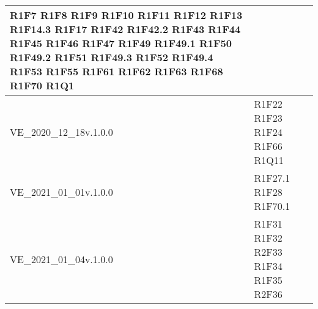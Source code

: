 \begin{center}
\begin{longtable}{|p{44mm}|p{22mm}|}
R1F7 \newline
R1F8 \newline
R1F9 \newline
R1F10 \newline
R1F11 \newline
R1F12 \newline
R1F13 \newline
R1F14.3 \newline
R1F17 \newline
R1F42 \newline
R1F42.2 \newline
R1F43 \newline
R1F44 \newline
R1F45 \newline
R1F46 \newline
R1F47 \newline
R1F49 \newline
R1F49.1 \newline
R1F50 \newline
R1F49.2 \newline
R1F51 \newline
R1F49.3 \newline
R1F52 \newline
R1F49.4 \newline
R1F53 \newline
R1F55 \newline
R1F61 \newline
R1F62 \newline
R1F63 \newline
R1F68 \newline
R1F70 \newline
R1Q1 
\\
\hline
VE\_2020\_12\_18v.1.0.0 &
R1F22 \newline
R1F23 \newline
R1F24 \newline
R1F66 \newline
R1Q11 
\\
\hline
VE\_2021\_01\_01v.1.0.0 &
R1F27.1 \newline
R1F28 \newline
R1F70.1 
\\
\hline
VE\_2021\_01\_04v.1.0.0 &
R1F31 \newline
R1F32 \newline
R2F33 \newline
R1F34 \newline
R1F35 \newline
R2F36 \newline

\end{longtable}
\end{center}
